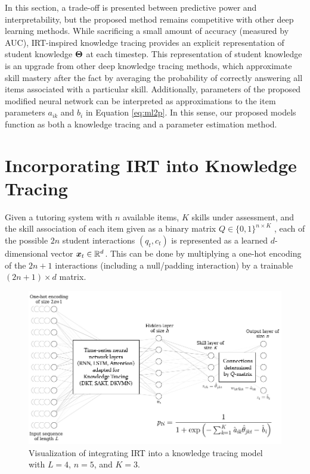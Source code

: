 In this section, a trade-off is presented between predictive power and interpretability, but the proposed method remains competitive with other deep learning methods. While sacrificing a small amount of accuracy (measured by AUC), IRT-inspired knowledge tracing provides an explicit representation of student knowledge $\boldsymbol{\Theta}$ at each timestep. This representation of student knowledge is an upgrade from other deep knowledge tracing methods, which approximate skill mastery after the fact by averaging the probability of correctly answering all items associated with a particular skill. Additionally, parameters of the proposed modified neural network can be interpreted as approximations to the item parameters $a_{ik}$ and $b_i$ in Equation \ref{eq:ml2p}. In this sense, our proposed models function as both a knowledge tracing and a parameter estimation method.


\section{Incorporating IRT into Knowledge Tracing}
Given a tutoring system with $n$ available items, $K$ skills under assessment, and the skill association of each item given as a binary matrix $Q \in \{0,1\}^{n \times K}$ \cite{daSilva2018}, each of the possible $2n$ student interactions $(q_t, c_t)$ is represented as a learned $d$-dimensional vector $\boldsymbol{x}_t \in \mathbb{R}^d$. This can be done by multiplying a one-hot encoding of the $2n+1$ interactions (including a null/padding interaction) by a trainable $(2n+1) \times d$ matrix.

\begin{figure}[h]
  \centering
  \includegraphics[width=.95\textwidth]{img/kt_irt/kt_irt_visual_with_equation_2.png}
  \caption{Visualization of integrating IRT into a knowledge tracing model with $L=4$, $n=5$, and $K=3$.}
  \label{fig:kt_irt_visual}
\end{figure}

